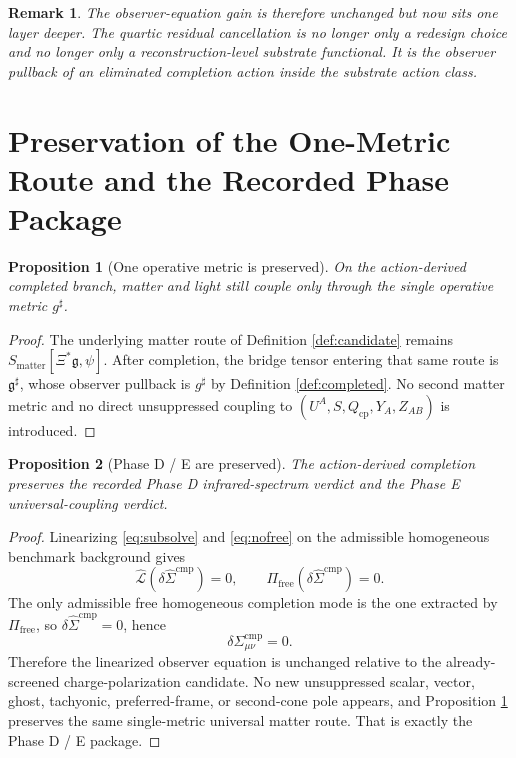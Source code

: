 \documentclass[11pt]{article}
\newcommand{\ObserverMap}{\Xi}
\newcommand{\BridgeMetric}{\mathfrak g}
\newcommand{\CompletedMetric}{g^{\sharp}}
\newcommand{\CompShift}{\Sigma^{\mathrm{cmp}}}
\newcommand{\CompLift}{\widehat\Sigma^{\mathrm{cmp}}}
\newcommand{\ChargeFields}{Q_{\mathrm{cp}}}
\newcommand{\SubReducedEin}{\widehat{\mathcal L}}
\newcommand{\FreeProj}{\Pi_{\mathrm{free}}}
\newcommand{\GaugeAux}{Y}
\newcommand{\ModeAux}{Z}
\newcommand{\MatterAct}{S_{\mathrm{matter}}}
\newtheorem{proposition}{Proposition}
\newtheorem{remark}{Remark}
\begin{document}
\begin{remark}
The observer-equation gain is therefore unchanged but now sits one layer deeper. The quartic residual cancellation is no longer only a redesign choice and no longer only a reconstruction-level substrate functional. It is the observer pullback of an eliminated completion action inside the substrate action class.
\end{remark}

\section{Preservation of the One-Metric Route and the Recorded Phase Package}

\begin{proposition}[One operative metric is preserved]
\label{prop:onemetric}
On the action-derived completed branch, matter and light still couple only through the single operative metric \(\CompletedMetric\).
\end{proposition}

\begin{proof}
The underlying matter route of Definition \ref{def:candidate} remains \(\MatterAct[\ObserverMap^*\BridgeMetric,\psi]\). After completion, the bridge tensor entering that same route is \(\BridgeMetric^\sharp\), whose observer pullback is \(\CompletedMetric\) by Definition \ref{def:completed}. No second matter metric and no direct unsuppressed coupling to \((U^A,S,\ChargeFields,\GaugeAux_A,\ModeAux_{AB})\) is introduced.
\end{proof}

\begin{proposition}[Phase D / E are preserved]
\label{prop:phaseDE}
The action-derived completion preserves the recorded Phase D infrared-spectrum verdict and the Phase E universal-coupling verdict.
\end{proposition}

\begin{proof}
Linearizing \eqref{eq:subsolve} and \eqref{eq:nofree} on the admissible homogeneous benchmark background gives
\[
\SubReducedEin(\delta\CompLift)=0,
\qquad
\FreeProj(\delta\CompLift)=0.
\]
The only admissible free homogeneous completion mode is the one extracted by \(\FreeProj\), so \(\delta\CompLift=0\), hence
\begin{equation}
\delta\CompShift_{\mu\nu}=0.
\label{eq:nolinear}
\end{equation}
Therefore the linearized observer equation is unchanged relative to the already-screened charge-polarization candidate. No new unsuppressed scalar, vector, ghost, tachyonic, preferred-frame, or second-cone pole appears, and Proposition \ref{prop:onemetric} preserves the same single-metric universal matter route. That is exactly the Phase D / E package.
\end{proof}
\end{document}
